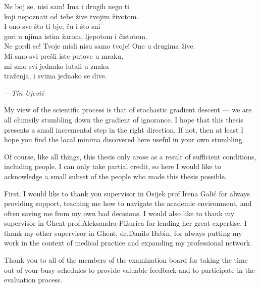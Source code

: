 
\renewcommand{\epigraphflush}{flushleft}
\renewcommand{\sourceflush}{flushleft}
\setlength{\epigraphwidth}{0.8\textwidth}
\setlength{\epigraphrule}{0pt}

\begin{acknowledgements}
  \addchaptertocentry{\acknowledgementname} %
  
 \epigraph{ 
Ne boj se, nisi sam! Ima i drugih nego ti\\
koji nepoznati od tebe žive tvojim životom.\\
I ono sve što ti bje, ču i što sni\\
gori u njima istim žarom, ljepotom i čistotom.\\[0.5em]
Ne gordi se! Tvoje misli nisu samo tvoje! One u drugima žive.\\
Mi smo svi prešli iste putove u mraku,\\
mi smo svi jednako lutali u znaku\\
traženja, i svima jednako se dive.
}{\hspace{1em}\textit{---Tin Ujević}}
  
  
My view of the scientific process is that of stochastic gradient descent --- we are all clumsily stumbling down the gradient of ignorance. I hope that this thesis presents a small incremental step in the right direction. If not, then at least I hope you find the local minima discovered here useful in your own stumbling. 

Of course, like all things, this thesis only arose as a result of sufficient conditions, including people. I can only take partial credit, so here I would like to acknowledge a small subset of the people who made this thesis possible.
  
First, I would like to thank you supervisor in Osijek prof.\@ Irena Galić for always providing support, teaching me how to navigate the academic environment, and often saving me from my own bad decisions. I would also like to thank my supervisor in Ghent prof.\@ Aleksandra Pižurica for lending her great expertise. I thank my other supervisor in Ghent, dr.\@ Danilo Babin, for always putting my work in the context of medical practice and expanding my professional network.
  
Thank you to all of the members of the examination board for taking the time out of your busy schedules to provide valuable feedback and to participate in the evaluation process.
  

\end{acknowledgements}
